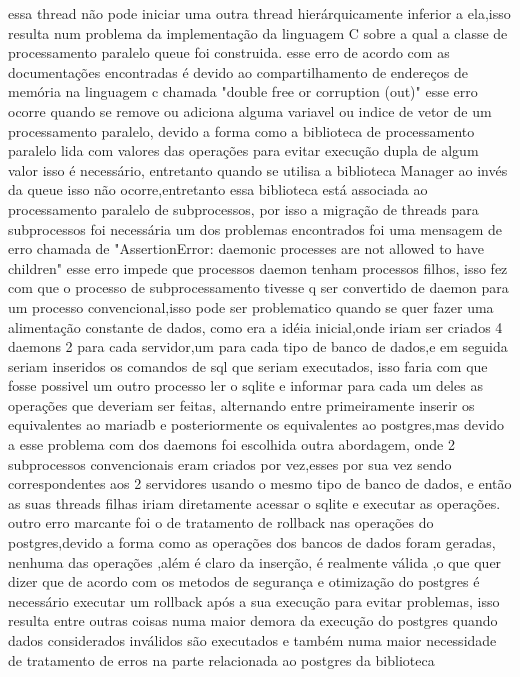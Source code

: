 \documentclass[
	12pt,				%
	openright,			%
	oneside,			%
	a4paper,			%
	english,			%
	french,				%
	spanish,			%
	brazil,				%
	]{abntex2}
\begin{document}
essa thread não pode iniciar uma outra thread hierárquicamente inferior a ela,isso resulta num problema da implementação da linguagem C sobre a qual a classe de processamento paralelo queue foi construida.
esse erro de acordo com as documentações encontradas é devido ao compartilhamento de endereços de memória na linguagem c chamada "double free or corruption (out)" esse erro ocorre quando se remove ou adiciona alguma variavel ou indice de vetor de um processamento paralelo,
devido a forma como a biblioteca de processamento paralelo lida com valores das operações para evitar execução dupla de algum valor isso é necessário,
entretanto quando se utilisa a biblioteca Manager ao invés da queue isso não ocorre,entretanto essa biblioteca está associada ao processamento paralelo de subprocessos,
por isso a migração de threads para subprocessos foi necessária\newline
um dos problemas encontrados foi uma mensagem de erro chamada de "AssertionError: daemonic processes are not allowed to have children" esse erro impede que processos daemon tenham processos filhos,
isso fez com que o processo de subprocessamento tivesse q ser convertido de daemon para um processo convencional,isso pode ser problematico quando se quer fazer uma alimentação constante de dados,
como era a idéia inicial,onde iriam ser criados 4 daemons 2 para cada servidor,um para cada tipo de banco de dados,e em seguida seriam inseridos os comandos de sql que seriam executados,
isso faria com que fosse possivel um outro processo ler o sqlite e informar para cada um deles as operações que deveriam ser feitas,
alternando entre primeiramente inserir os equivalentes ao mariadb e posteriormente os equivalentes ao postgres,mas devido a esse problema com dos daemons foi escolhida outra abordagem,
onde 2 subprocessos convencionais eram criados por vez,esses por sua vez sendo correspondentes aos 2 servidores usando o mesmo tipo de banco de dados,
e então as suas threads filhas iriam diretamente acessar o sqlite e executar as operações.\newline
outro erro marcante foi o de tratamento de rollback nas operações do postgres,devido a forma como as operações dos bancos de dados foram geradas,
nenhuma das operações ,além é claro da inserção, é realmente válida ,o que quer dizer que de acordo com os metodos de segurança e otimização do postgres é necessário executar um rollback após a sua execução para evitar problemas,
isso resulta entre outras coisas numa maior demora da execução do postgres quando dados considerados inválidos são executados e também numa maior necessidade de tratamento de erros na parte relacionada ao postgres da biblioteca 
\end{document}

